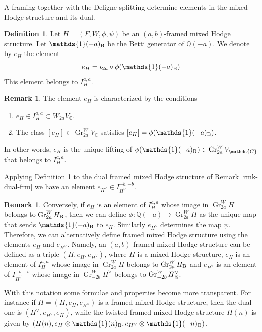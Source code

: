\documentclass[11pt,a4paper]{amsart}
\newcommand{\Betti}{\text{\rm B}}
\newcommand{\C}{\mathds{C}}
\newcommand{\Q}{\mathds{Q}}
\newcommand{\bfone}{{\mathds{1}}}
\DeclareMathOperator {\Gr} {Gr}
\numberwithin{equation}{section}
\theoremstyle{plain}
\theoremstyle{definition}
\newtheorem{df}[prop]{Definition}
\newtheorem{rmk}[prop]{Remark}
\begin{document}
A framing together with the Deligne splitting determine elements in
the mixed Hodge structure and its dual.

\begin{df}\label{def:9} Let $H=(F,W, \phi,\psi)$ be an $(a,b)$-framed
  mixed Hodge structure. Let $\bfone(-a)_{\Betti}$ be the Betti generator of
  $\Q(-a)$.
  We denote by $e_{H}$ the element
  \begin{displaymath}
    e_{H}=\iota_{2a}\circ \phi (\bfone(-a)_{\Betti}) 
  \end{displaymath}
  This element belongs to $I^{a,a}_{H}$.
\end{df}


\begin{rmk}\label{rem:1}
  The element $e_{H}$ is characterized by the conditions
  \begin{enumerate}
  \item $e_{H}\in I_{H}^{a,a}\subset W_{2a}V_{\C}$.
  \item The class $[e_{H}]\in \Gr_{2a}^{W}V_{\C}$ satisfies
    $[e_{H}]=\phi (\bfone(-a)_{\Betti})$.
  \end{enumerate}
  In other words, $e_{H}$ is the unique lifting of $\phi
  (\bfone(-a)_{\Betti})\in \Gr_{2a}^{W}V_{\C}$ 
  that belongs to $I^{a,a}_{H}$.
\end{rmk}

  Applying Definition \ref{def:9} to the dual framed mixed Hodge structure of
  Remark \ref{rmk-dual-frm} we have an element $e_{H^{\vee}}\in
  I^{-b,-b}_{H^{\vee}}$.

  \begin{rmk}\label{rem:11}
    Conversely, if $e_H$ is an element of $I^{a,a}_{H}$ whose image
    in $\Gr_{2a}^{W}H$ belongs to $\Gr_{2a}^{W}H_{\Betti}$, then we can
    define $\phi \colon \Q(-a)\longrightarrow \Gr_{2a}^{W}H$ as the
    unique map that sends $\bfone(-a)_{\Betti}$ to $e_{H}$. Similarly
    $e_{H^{\vee}}$ determines the map $\psi $.  Therefore, we can
    alternatively  define framed mixed Hodge structure using the
    elements $e_{H}$ and $e_{H^{\vee}}$. Namely,  an $(a,b)$-framed mixed
    Hodge structure can be defined as a triple $(H,e_{H},e_{H^{\vee}})$, 
  where $H$ is a mixed Hodge structure, $e_{H}$ is an element of $I^{a,a}_{H}$ whose image
  in $\Gr_{2a}^{W}H$ belongs to  $\Gr_{2a}^{W}H_{\Betti}$  and $e_{H^{\vee}}$ is
  an element of $I^{-b,-b}_{H^{\vee}}$ whose image in
  $\Gr_{-2b}^{W}H^{\vee}$ belongs to  $\Gr_{-2b}^{W}H^{\vee}_{\Betti}$. 

  With this notation some formulae and properties become more
  transparent. For instance 
  if $H=(H,e_{H},e_{H^{\vee}})$ is a framed mixed Hodge structure,
  then the dual one is
  $(H^{\vee},e_{H^{\vee}},e_{H})$, while the twisted framed mixed
  Hodge structure $H(n)$ is given by
  $(H(n),e_{H}\otimes \bfone(n)_{\Betti},e_{H^{\vee}}\otimes \bfone(-n)_{\Betti})$. 
\end{rmk}
\end{document}
